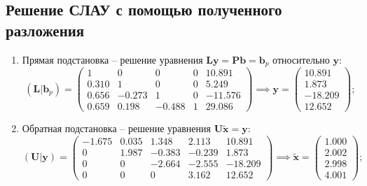 \subsection{Решение СЛАУ с помощью полученного разложения}
\begin{enumerate}
    \item Прямая подстановка -- решение уравнения $\mathbf{Ly} = \mathbf{Pb}=\mathbf{b}_p$ относительно $\mathbf{y}$:
    \[ (\mathbf{L}|\mathbf{b}_p) =
    \left(
    \begin{array}{cccc|c}
        1    &  0    &   0    &   0& 10.891 \\
        0.310&  1    &   0    &   0&  5.249\\
        0.656& -0.273&   1    &   0&-11.576\\
        0.659&  0.198&  -0.488&   1& 29.086
    \end{array}\right) \implies
    \mathbf{y} = \begin{pmatrix} 10.891 \\1.873 \\ -18.209 \\ 12.652 \end{pmatrix}; \]
    \item Обратная подстановка -- решение уравнения $\mathbf{U}\widetilde{\mathbf{x}} = \mathbf{y}$:
    \[ (\mathbf{U}|\mathbf{y}) =
    \left( \begin{array}{cccc|c}
      -1.675&  0.035&   1.348&   2.113& 10.891\\
       0    &  1.987&  -0.383&  -0.239&  1.873\\
       0    &  0    &  -2.664&  -2.555&-18.209\\
       0    &  0    &   0    &   3.162& 12.652
    \end{array} \right) \implies
    \widetilde{\mathbf{x}} = \begin{pmatrix} 1.000\\2.002\\2.998\\4.001\end{pmatrix}; \]


\end{enumerate}

